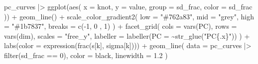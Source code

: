 \documentclass[
]{interact}
\newenvironment{Shaded}{\begin{snugshade}}{\end{snugshade}}
\newcommand{\AttributeTok}[1]{\textcolor[rgb]{0.40,0.45,0.13}{#1}}
\newcommand{\DecValTok}[1]{\textcolor[rgb]{0.68,0.00,0.00}{#1}}
\newcommand{\FloatTok}[1]{\textcolor[rgb]{0.68,0.00,0.00}{#1}}
\newcommand{\FunctionTok}[1]{\textcolor[rgb]{0.28,0.35,0.67}{#1}}
\newcommand{\NormalTok}[1]{\textcolor[rgb]{0.00,0.23,0.31}{#1}}
\newcommand{\SpecialCharTok}[1]{\textcolor[rgb]{0.37,0.37,0.37}{#1}}
\newcommand{\StringTok}[1]{\textcolor[rgb]{0.13,0.47,0.30}{#1}}
\begin{document}
\label{cell-fig-emph-pc-curves}
\begin{Shaded}
\begin{Highlighting}[]
\NormalTok{pc\_curves }\SpecialCharTok{|\textgreater{}} 
  \FunctionTok{ggplot}\NormalTok{(}\FunctionTok{aes}\NormalTok{(}
    \AttributeTok{x =}\NormalTok{ knot, }\AttributeTok{y =}\NormalTok{ value, }\AttributeTok{group =}\NormalTok{ sd\_frac, }\AttributeTok{color =}\NormalTok{ sd\_frac}
\NormalTok{  )) }\SpecialCharTok{+}
  \FunctionTok{geom\_line}\NormalTok{() }\SpecialCharTok{+}
  \FunctionTok{scale\_color\_gradient2}\NormalTok{(}
    \AttributeTok{low =} \StringTok{"\#762a83"}\NormalTok{, }\AttributeTok{mid =} \StringTok{"grey"}\NormalTok{, }\AttributeTok{high =} \StringTok{"\#1b7837"}\NormalTok{,}
    \AttributeTok{breaks =} \FunctionTok{c}\NormalTok{(}\SpecialCharTok{{-}}\DecValTok{1}\NormalTok{, }\DecValTok{0}\NormalTok{ , }\DecValTok{1}\NormalTok{)}
\NormalTok{  ) }\SpecialCharTok{+}
  \FunctionTok{facet\_grid}\NormalTok{(}
    \AttributeTok{cols =} \FunctionTok{vars}\NormalTok{(PC), }\AttributeTok{rows =} \FunctionTok{vars}\NormalTok{(dim),}
    \AttributeTok{scales =} \StringTok{"free\_y"}\NormalTok{,}
    \AttributeTok{labeller =} \FunctionTok{labeller}\NormalTok{(}\AttributeTok{PC =} \SpecialCharTok{\textasciitilde{}}\FunctionTok{str\_glue}\NormalTok{(}\StringTok{"PC\{.x\}"}\NormalTok{))}
\NormalTok{  ) }\SpecialCharTok{+}
  \FunctionTok{labs}\NormalTok{(}\AttributeTok{color =} \FunctionTok{expression}\NormalTok{(}\FunctionTok{frac}\NormalTok{(s[k], sigma[k]))) }\SpecialCharTok{+}
  \FunctionTok{geom\_line}\NormalTok{(}
    \AttributeTok{data =}\NormalTok{ pc\_curves }\SpecialCharTok{|\textgreater{}} \FunctionTok{filter}\NormalTok{(sd\_frac }\SpecialCharTok{==} \DecValTok{0}\NormalTok{),}
    \AttributeTok{color =} \StringTok{\textquotesingle{}black\textquotesingle{}}\NormalTok{, }\AttributeTok{linewidth =} \FloatTok{1.2}
\NormalTok{  )}
\end{Highlighting}
\end{Shaded}
\end{document}
